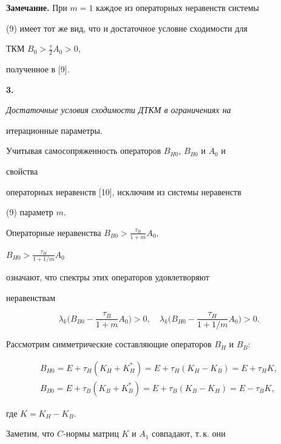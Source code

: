  


{\bf Замечание.} При $m=1$ каждое из операторных неравенств системы 


(9) имеет тот же вид, что и достаточное условие сходимости для  


ТКМ $B_0>\frac{\tau}{2}A_0>0$, 


полученное в [9]. 


\medskip 


 


{\bf 3.} {\it Достаточные условия сходимости ДТКМ в ограничениях на  


итерационные параметры.} 


Учитывая самосопряженность операторов $B_{H0}$, $B_{B0}$ и $A_0$ и 


свойства  


операторных неравенств [10], исключим из системы неравенств  


(9) параметр $m$.  


Операторные неравенства $B_{B0}>\frac{\tau_B}{1+m}A_0$, 


$B_{H0}>\frac{\tau_H}{1+1/m}A_0$ 


означают, что спектры этих операторов удовлетворяют 


неравенствам 


\begin{equation} 


\lambda_k\bigg(B_{B0}-\frac{\tau_B}{1+m}A_0 \bigg)>0,\quad 


\lambda_k\bigg(B_{H0}-\frac{\tau_H}{1+1/m}A_0 \bigg)>0. 


\end{equation} 


 


Рассмотрим симметрические составляющие операторов $B_H$ и $B_B$: 


\begin{gather} 


B_{H0}=E+\tau_H(K_H+K^*_H)=E+\tau_H(K_H-K_B)=E+\tau_H K,\\ 


B_{B0}=E+\tau_B(K_B+K^*_B)=E+\tau_B(K_B-K_H)=E-\tau_B K, 


\end{gather} 


где $K=K_H-K_B$. 


 


Заметим, что $C$-нормы матриц $K$ и $A_1$ совпадают, т.\,к. они 


